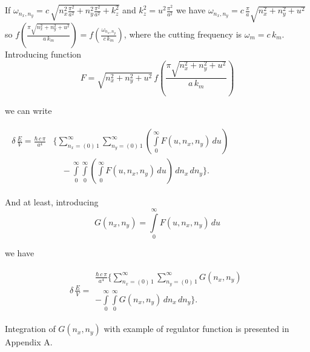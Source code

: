 \documentclass[twoside, 10pt, ptm]{article}
\begin{document}
\begin{multicols}{2}
    If \(\omega _{n_x,n_y} = c\,\sqrt{n_x^2\frac{\pi^2}{a^2}+n_y^2\frac{\pi^2}{a^2}+k_z^2}\)
and \(k_z^2 = u^2 \frac{\pi^2}{a^2}\) we have
\(\omega _{n_x,n_y} = c \, \frac{\pi}{a} \sqrt{n_x^2+n_y^2+u^2}\) so
\(f\left(\frac{\pi\sqrt{n_x^2 + n_y^2+u^2}}{a\,k_m}\right) = f\left(\frac{\omega _{n_x,n_y}}{c\,k_m}\right)\),
where the cutting frequency is \(\omega_m = c\,k_m\).
    Introducing function
\noindent
\begin{equation} \label{eq:4}
F = %
\sqrt{n_x^2 + n_y^2+u^2}\,
f\left(\frac{\pi\sqrt{n_x^2 + n_y^2+u^2}}{a\,k_m}\right)
\end{equation}

    we can write

\noindent
$\begin{array}{c}
\begin{array}{ll}
\delta\,\frac{E}{V} =
\frac{\hbar\,c\,\pi}{a^4}
&\Bigg\{
\sum\limits_{n_x=\left(0\right)\,1}^{\infty}
\sum\limits_{n_y=\left(0\right)\,1}^{\infty}
\left(\int\limits_{0}^{\infty}F\left(u, n_x, n_y\right)\,d{u}\right)
\\
\, & \,\,\,\,\,\, - \int\limits_{0}^{\infty}
\int\limits_{0}^{\infty}
\left(\int\limits_{0}^{\infty}F\left(u, n_x, n_y\right)\,d{u}\right)
\,d{n_x}\,d{n_y}
\Bigg\}.
\end{array}
\end{array}$

    And at least, introducing
\noindent
\begin{equation} \label{eq:5}
G\left(n_x, n_y\right) = \int\limits_{0}^{\infty}F\left(u, n_x, n_y\right)\,d{u}
\end{equation}

    we have

    \begin{equation} \label{eq:6}
\begin{array}{lr}
\delta\,\frac{E}{V} =
\begin{array}{c}
 \frac{\hbar\,c\,\pi}{a^4} \Bigg\{
\sum\limits_{n_x=\left(0\right)\,1}^{\infty}
\sum\limits_{n_y=\left(0\right)\,1}^{\infty}
G\left(n_x, n_y\right)
\\
- \int\limits_{0}^{\infty}
\int\limits_{0}^{\infty}
G\left(n_x, n_y\right)
\,d{n_x}\,d{n_y}
\Bigg\}.
\end{array}
\end{array}
\end{equation}

Integration of \(G\left(n_x, n_y\right)\) with example of regulator
function is presented in Appendix A.


\end{multicols}
\end{document}
